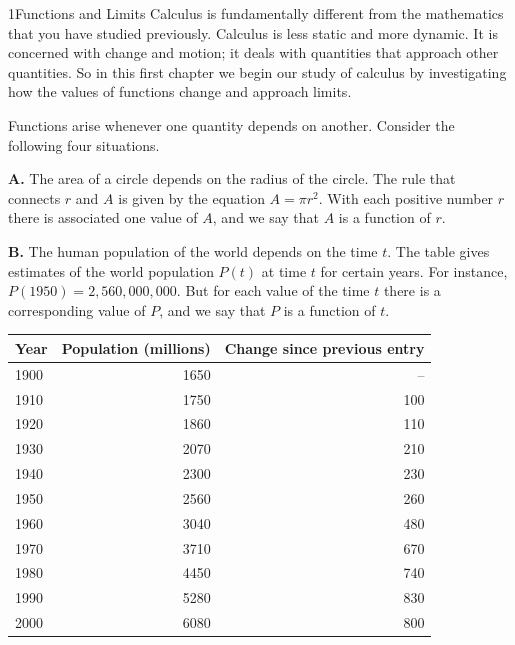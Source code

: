 \documentclass[boxednum]{chapterstart}
\begin{document}
\begin{chapterstart}{1}{Functions and Limits}
Calculus is fundamentally different from the mathematics that you have
studied previously. Calculus is less static and more dynamic. It is
concerned with change and motion; it deals with quantities that approach
other quantities. So in this first chapter we begin our study of calculus
by investigating how the values of functions change and approach limits.
\end{chapterstart}


Functions arise whenever one quantity depends on another. Consider the
following four situations.

\textbf{A.} The area of a circle depends on the radius of the circle. The
rule that connects $r$ and $A$ is given by the equation $A = \pi r^2$. With
each positive number $r$ there is associated one value of $A$, and we say
that $A$ is a function of $r$.

\textbf{B.} The human population of the world depends on the time $t$. The
table gives estimates of the world population $P(t)$ at time $t$ for certain
years. For instance, $P(1950) = 2{,}560{,}000{,}000$. But for each value of
the time $t$ there is a corresponding value of $P$, and we say that $P$ is a
function of $t$.

\begin{widetable}[1.0in]
  \caption{World population estimates, 1900--2000.}
  \label{tab:population}
  \begin{tabular*}{\linewidth}{@{\extracolsep{\fill}}lrr}
    \toprule
    Year & Population (millions) & Change since previous entry \\
    \midrule
    1900 & 1650 & --   \\
    1910 & 1750 & 100  \\
    1920 & 1860 & 110  \\
    1930 & 2070 & 210  \\
    1940 & 2300 & 230  \\
    1950 & 2560 & 260  \\
    1960 & 3040 & 480  \\
    1970 & 3710 & 670  \\
    1980 & 4450 & 740  \\
    1990 & 5280 & 830  \\
    2000 & 6080 & 800  \\
    \bottomrule
  \end{tabular*}
\end{widetable}
\end{document}

